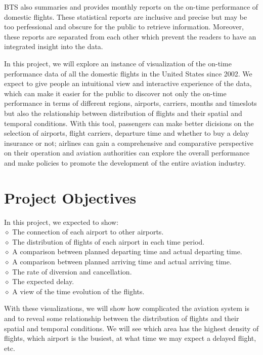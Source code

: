 \documentclass[12pt]{article}
\begin{document}
BTS also summaries and provides monthly reports on the on-time performance of domestic flights. These statistical reports are inclusive and precise but may be too perfessional and obscure for the public to retrieve information. Moreover, these reports are separated from each other which prevent the readers to have an integrated insight into the data.

In this project, we will explore an instance of visualization of the on-time performance data of all the domestic flights in the United States since 2002. We expect to give people an intuitional view and interactive experience of the data, which can make it easier for the public to discover not only the on-time performance in terms of different regions, airports, carriers, months and timeslots but also the relationship between distribution of flights and their spatial and temporal conditions. With this tool, passengers can make better dicisions on the selection of airports, flight carriers, departure time and whether to buy a delay insurance or not; airlines can gain a comprehensive and comparative perspective on their operation and aviation authorities can explore the overall performance and make policies to promote the development of the entire aviation industry.

\section{Project Objectives}
    \noindent In this project, we expected to show:\\   
    $\diamond$ The connection of each airport to other airports.\\
    $\diamond$ The distribution of flights of each airport in each time period.\\
    $\diamond$ A comparison between planned departing time and actual departing time.\\
    $\diamond$ A comparison between planned arriving time and actual arriving time.\\
    $\diamond$ The rate of diversion and cancellation.\\
    $\diamond$ The expected delay.\\
    $\diamond$ A view of the time evolution of the flights.
    
    With these visualizations, we will show how complicated the aviation system is and to reveal some relationship between the distribution of flights and their spatial and temporal conditions. We will see which area has the highest density of flights, which airport is the busiest, at what time we may expect a delayed flight, etc.    
    
\end{document}
